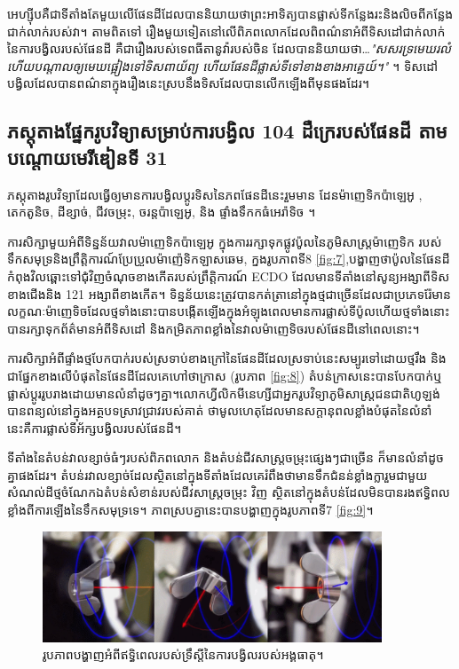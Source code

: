 \documentclass[10pt,twocolumn,letterpaper]{article}
\begin{document}
អេហ្ស៊ីបគឺជាទីតាំងតែមួយលើផែនដីដែលបាននិយាយថាព្រះអាទិត្យបានផ្លាស់ទីកន្លែងរះនិងលិចពីកន្លែងជាក់លាក់របស់វា។ តាមពិតទៅ រឿងមួយទៀតនៅលើពិភពលោកដែលពិពណ៌នាអំពីទិសដៅជាក់លាក់នៃការបង្វិលរបស់ផែនដី គឺជារឿងរបស់ទេពធីតានូវ៉ារបស់ចិន ដែលបាននិយាយថា…\textit{"សសរទ្រមេឃរលំ ហើយបណ្តាលឲ្យមេឃផ្អៀងទៅទិសពាយ័ព្យ ហើយផែនដីផ្លាស់ទីទៅខាងខាងអាគ្នេយ៍។"} \cite{8}។ ទិសដៅបង្វិលដែលបានពណ៌នាក្នុងរឿងនេះស្របនឹងទិសដែលបានលើកឡើងពីមុនផងដែរ។

\subsection{ភស្តុតាងផ្នែករូបវិទ្យាសម្រាប់ការបង្វិល 104 ដឺក្រេរបស់ផែនដី តាមបណ្តោយមេរីឌៀនទី 31}

ភស្តុតាងរូបវិទ្យាដែលធ្វើឲ្យមានការបង្វិលប្តូរទិសនៃភពផែនដីនេះរួមមាន ដែនម៉ាញេទិកប៉ាឡេអូ , តេកតូនិច, ដីខ្សាច់, ជីវចម្រុះ, ចរន្តប៉ាឡេអូ, និង ផ្ទាំងទឹកកធំអេរ៉ាទិច ។

ការសិក្សាមួយអំពីទិន្នន័យវាលម៉ាញេទិកប៉ាឡេអូ ក្នុងការរក្សាទុកផ្លូវប៉ូលនៃភូមិសាស្ត្រម៉ាញេទិក របស់ទឹកសមុទ្រនិងព្រឹត្តិការណ៍ប្រែប្រួលម៉ាញ៉េទិកឡាសឆេម\cite{35}, ក្នងរូបភាពទី8 \ref{fig:7},បង្ហាញថាប៉ូលនៃផែនដីកំពុងវិលឆ្ពោះទៅជុំវិញចំណុចខាងកើតរបស់ព្រឹត្តិការណ៍ ECDO ដែលមានទីតាំងនៅសូន្យអង្សាពីទិសខាងជើងនិង 121 អង្សាពីខាងកើត។ ទិន្នន័យនេះត្រូវបានកត់ត្រានៅក្នុងថ្មជាច្រើនដែលជាប្រភេទរ៉ែមានលក្ខណៈម៉ាញេទិចដែលថ្មទាំងនោះបានបង្កើតឡើងក្នុងអំឡុងពេលមានការផ្លាស់ទីប៉ូលហើយថ្មទាំងនោះបានរក្សាទុកព័ត៌មានអំពីទិសដៅ និងកម្រិតភាពខ្លាំងនៃវាលម៉ាញេទិចរបស់ផែនដីនៅពេលនោះ។

ការសិក្សាអំពីផ្ទាំងថ្មបែកបាក់របស់ស្រទាប់ខាងក្រៅនៃផែនដី​ដែលស្រទាប់នេះសម្បូរទៅដោយថ្មរឹង និងជាផ្នែកខាងលើបំផុតនៃផែនដីដែលគេហៅថា​ក្រាស (រូបភាព \ref{fig:8}) តំបន់ក្រាសនេះបានបែកបាក់ឬផ្លាស់ប្តូររូបរាងដោយមានលំនាំដូចៗគ្នា។លោកហ្វីលិក​មីនេហ្សី​ជាអ្នករូបវិទ្យាភូមិសាស្ត្រជនជាតិហូឡង់ បានពន្យល់នៅក្នុងអត្ថបទស្រាវជ្រាវរបស់គាត់\cite{36} ថាមូលហេតុដែលមានសក្ដានុពលខ្លាំងបំផុតនៃលំនាំនេះគឺការផ្លាស់ទីអ័ក្សបង្វិលរបស់ផែនដី។

ទីតាំងនៃតំបន់វាលខ្សាច់ធំៗរបស់ពិភពលោក និងតំបន់ជីវសាស្ត្រចម្រុះផ្សេងៗជាច្រើន ក៏មានលំនាំដូចគ្នាផងដែរ។ តំបន់រវាលខ្សាច់ដែលស្ថិតនៅក្នុងទីតាំងដែលគេរំពឹងថាមានទឹកជំនន់ខ្លាំងក្លារួមជាមួយសំណល់ដីថ្មចំណែកឯតំបន់សំខាន់របស់ជីវសាស្ត្រចម្រុះ វិញ ស្ថិតនៅក្នុងតំបន់ដែលមិនបានរងឥទ្ធិពលខ្លាំងពីការឡើងនៃទឹកសមុទ្រទេ\cite{28}។ ភាពស្របគ្នានេះបានបង្ហាញក្នុងរូបភាពទី7 \ref{fig:9}។

\begin{figure}[t]
\begin{center}
\includegraphics[width=0.9\textwidth]{dzhani.jpg}
\end{center}
   \caption{រូបភាពបង្ហាញអំពីឥទ្ធិពេលរបស់ទ្រឹស្តីនៃការបង្វិលរបស់អង្គធាតុ\cite{28}។}
\label{fig:10}
\end{figure}
\end{document}
